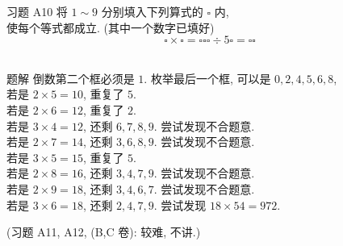 \documentclass[content.tex]{subfiles}
\begin{document}
\begin{frame}{习题 A10}
将 $1 \sim 9$ 分别填入下列算式的 $\square$ 内, \\
使每个等式都成立. (其中一个数字已填好)
$$
\square \times \square = 
\square \square \square \div 5 \square =
\square \square
$$
\\[-1em]
\begin{exampleblock}{题解}
倒数第二个框必须是 $1$. 
枚举最后一个框, 可以是 $0,2,4,5,6,8$, \\
若是 $2\times 5=10$, 重复了 $5$. \\
若是 $2\times 6=12$, 重复了 $2$. \\
若是 $3\times 4=12$, 还剩 $6,7,8,9$. 尝试发现不合题意. \\
若是 $2\times 7=14$, 还剩 $3,6,8,9$. 尝试发现不合题意. \\
若是 $3\times 5=15$, 重复了 $5$. \\
若是 $2\times 8=16$, 还剩 $3,4,7,9$. 尝试发现不合题意. \\
若是 $2\times 9=18$, 还剩 $3,4,6,7$. 尝试发现不合题意. \\
若是 $3\times 6=18$, 还剩 $2,4,7,9$. 尝试发现 $18\times 54 = 972$. \\
\end{exampleblock}
\centering (习题 A11, A12, (B,C 卷): 较难, 不讲.) \\
\end{frame}
\end{document}
